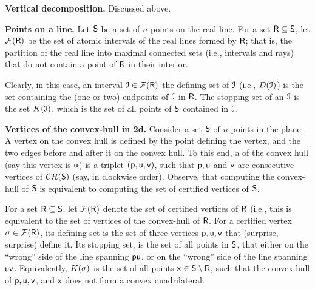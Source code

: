 \begin{compactenumA}
    \item \textbf{Vertical decomposition.} %
    Discussed above.

    \smallskip
    
    \item \textbf{Points on a line.}  %
    Let $\mathsf{S}$ be a set of $n$ points on the real line. For a set
    $\mathsf{R} \subseteq \mathsf{S}$, let $\RegionsSet{\Sample}$ be the set
    of atomic intervals of the real lines formed by $\mathsf{R}$; that
    is, the partition of the real line into maximal connected sets
    (i.e., intervals and rays) that do not contain a point of
    $\mathsf{R}$ in their interior.
    
    Clearly, in this case, an interval $\Interval \in
    \RegionsSet{\Sample}$ the defining set of $\EuScript{I}$ (i.e.,
    $\DefSet{ \Interval }$) is the set containing the (one or two)
    endpoints of $\EuScript{I}$ in $\mathsf{R}$. The stopping set of an
    $\EuScript{I}$ is the set $\KillSet{ \Interval }$, which is the set
    of all points of $\mathsf{S}$ contained in $\EuScript{I}$.
    
    \smallskip
    \item \textbf{Vertices of the convex-hull in 2d.}
    Consider a set $\mathsf{S}$ of $n$ points in the plane. A vertex on
    the convex hull is defined by the point defining the vertex, and
    the two edges before and after it on the convex hull. To this end,
    a  of the convex hull (say this vertex is
    $\mathsf{u}$) is a triplet $(\mathsf{p}, \mathsf{u}, \mathsf{v})$, such that $\mathsf{p},
    \mathsf{u}$ and $\mathsf{v}$ are consecutive vertices of $\CHX{\ObjSet}$
    (say, in clockwise order).  Observe, that computing the
    convex-hull of $\mathsf{S}$ is equivalent to computing the set of
    certified vertices of $\mathsf{S}$.
    
    For a set $\mathsf{R} \subseteq \mathsf{S}$, let $\RegionsSet{\Sample}$
    denote the set of certified vertices of $\mathsf{R}$ (i.e., this is
    equivalent to the set of vertices of the convex-hull of
    $\mathsf{R}$. For a certified vertex $\Trap \in
    \RegionsSet{\Sample}$, its defining set is the set of three
    vertices $\mathsf{p}, \mathsf{u}, \mathsf{v}$ that (surprise, surprise) define
    it. Its stopping set, is the set of all points in $\mathsf{S}$, that
    either on the ``wrong'' side of the line spanning $\mathsf{p} \mathsf{u}$, or
    on the ``wrong'' side of the line spanning $\mathsf{u}
    \mathsf{v}$. Equivalently, $\KillSet{\Trap}$ is the set of all points
    ${\mathsf{x}} \in \mathsf{S} \setminus \mathsf{R}$, such that the convex-hull
    of $\mathsf{p}, \mathsf{u}, \mathsf{v}$, and ${\mathsf{x}}$ does not form a convex
    quadrilateral.
    

\end{compactenumA}
